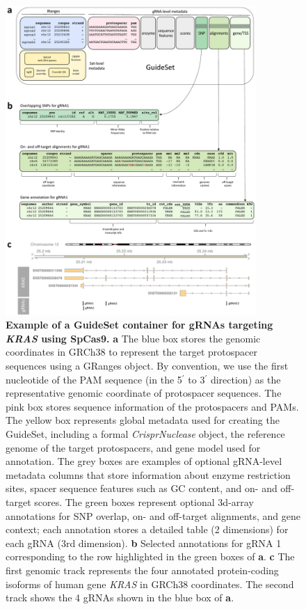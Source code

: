 \documentclass[pdftex,english,10pt]{article}
\begin{document}
\begin{figure}
\centering
\includegraphics[width=0.85\textwidth]{figures/guideset/guideset.pdf}
  \caption{\textbf{Example of a GuideSet container for gRNAs targeting \textit{KRAS} using SpCas9.} 
 \textbf{a} The blue box stores the genomic coordinates in GRCh38 to represent the target protospacer sequences using a GRanges object. 
By convention, we use the first nucleotide of the PAM sequence (in the 5$^{\prime}$ to 3$^{\prime}$ direction) as the representative genomic coordinate of protospacer sequences. The pink box stores sequence information of the protospacers and PAMs. The yellow box represents global metadata used for creating the GuideSet, including a formal \textit{CrisprNuclease} object, the reference genome of the target protospacers, and gene model used for annotation. The grey boxes are examples of optional gRNA-level metadata columns that store information about enzyme restriction sites, spacer sequence features such as GC content, and on- and off-target scores. The green boxes represent optional 3d-array annotations for SNP overlap, on- and off-target alignments, and gene context; each annotation stores a detailed table (2 dimensions) for each gRNA (3rd dimension). 
\textbf{b} Selected annotations for gRNA 1 corresponding to the row highlighted in the green boxes of \textbf{a}. 
\textbf{c} The first genomic track represents the four annotated protein-coding isoforms of human gene \textit{KRAS} in GRCh38 coordinates. The second track shows the 4 gRNAs shown in the blue box of \textbf{a}.
}
  \label{fig:guideset}
\end{figure}
\end{document}
